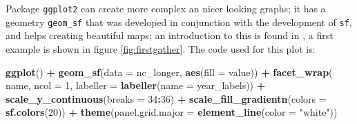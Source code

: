 \documentclass[]{book}
\newenvironment{Shaded}{\begin{snugshade}}{\end{snugshade}}
\newcommand{\DataTypeTok}[1]{\textcolor[rgb]{0.13,0.29,0.53}{#1}}
\newcommand{\DecValTok}[1]{\textcolor[rgb]{0.00,0.00,0.81}{#1}}
\newcommand{\FloatTok}[1]{\textcolor[rgb]{0.00,0.00,0.81}{#1}}
\newcommand{\KeywordTok}[1]{\textcolor[rgb]{0.13,0.29,0.53}{\textbf{#1}}}
\newcommand{\NormalTok}[1]{#1}
\newcommand{\OperatorTok}[1]{\textcolor[rgb]{0.81,0.36,0.00}{\textbf{#1}}}
\newcommand{\StringTok}[1]{\textcolor[rgb]{0.31,0.60,0.02}{#1}}
\begin{document}
Package \texttt{ggplot2} \citep{R-ggplot2, ggplot2} can create
more complex an nicer looking graphs; it has a geometry \texttt{geom\_sf}
that was developed in conjunction with the development of \texttt{sf}, and
helps creating beautiful maps; an introduction to this is found in
\citep{moreno}, a first example is shown in figure \ref{fig:firstgather}.
The code used for this plot is:

\begin{Shaded}
\end{Shaded}

\begin{Shaded}
\begin{Highlighting}[]
\KeywordTok{ggplot}\NormalTok{() }\OperatorTok{+}\StringTok{ }\KeywordTok{geom_sf}\NormalTok{(}\DataTypeTok{data =}\NormalTok{ nc_longer, }\KeywordTok{aes}\NormalTok{(}\DataTypeTok{fill =}\NormalTok{ value)) }\OperatorTok{+}\StringTok{ }
\StringTok{  }\KeywordTok{facet_wrap}\NormalTok{(}\OperatorTok{~}\StringTok{ }\NormalTok{name, }\DataTypeTok{ncol =} \DecValTok{1}\NormalTok{, }\DataTypeTok{labeller =} \KeywordTok{labeller}\NormalTok{(}\DataTypeTok{name =}\NormalTok{ year_labels)) }\OperatorTok{+}
\StringTok{  }\KeywordTok{scale_y_continuous}\NormalTok{(}\DataTypeTok{breaks =} \DecValTok{34}\OperatorTok{:}\DecValTok{36}\NormalTok{) }\OperatorTok{+}
\StringTok{  }\KeywordTok{scale_fill_gradientn}\NormalTok{(}\DataTypeTok{colors =} \KeywordTok{sf.colors}\NormalTok{(}\DecValTok{20}\NormalTok{)) }\OperatorTok{+}
\StringTok{  }\KeywordTok{theme}\NormalTok{(}\DataTypeTok{panel.grid.major =} \KeywordTok{element_line}\NormalTok{(}\DataTypeTok{color =} \StringTok{"white"}\NormalTok{))}
\end{Highlighting}
\end{Shaded}
\end{document}
